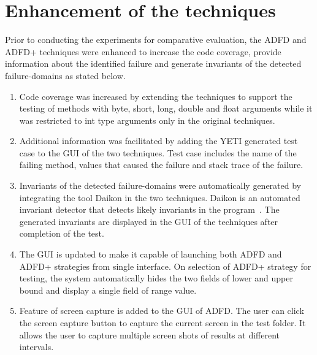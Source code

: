\section{Enhancement of the techniques}
Prior to conducting the experiments for comparative evaluation, the ADFD and ADFD+ techniques were enhanced to increase the code coverage, provide information about the identified failure and generate invariants of the detected failure-domains as stated below. 
\begin{enumerate}

\item Code coverage was increased by extending the techniques to support the testing of methods with byte, short, long, double and float arguments while it was restricted to int type arguments only in the original techniques.

\item Additional information was facilitated by adding the YETI generated test case to the GUI of the two techniques. Test case includes the name of the failing method, values that caused the failure and stack trace of the failure.

\item Invariants of the detected failure-domains were automatically generated by integrating the tool Daikon in the two techniques. Daikon is an automated invariant detector that detects likely invariants in the program~\cite{ernst2007daikon}. The generated invariants are displayed in the GUI of the techniques after completion of the test. 

\item The GUI is updated to make it capable of launching both ADFD and ADFD+ strategies from single interface. On selection of ADFD+ strategy for testing, the system automatically hides the two fields of lower and upper bound and display a single field of range value. 

\item Feature of screen capture is added to the GUI of ADFD. The user can click the screen capture button to capture the current screen in the test folder. It allows the user to capture multiple screen shots of results at different intervals. 

\end{enumerate}

